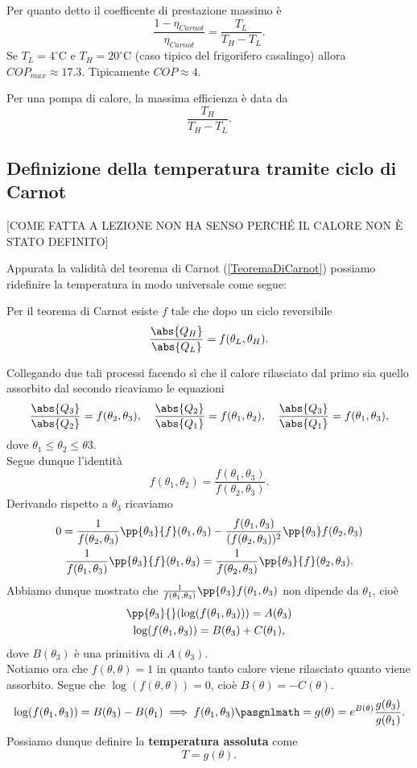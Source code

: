 \begin{remark}
Per quanto detto il coefficente di prestazione massimo \`e
\[\frac{1-\eta_{Carnot}}{\eta_{Carnot}}= \frac{T_L}{T_H-T_L}.\]
Se $T_L=4^\circ\mathrm{C}$ e $T_H=20^\circ\mathrm{C}$ (caso tipico del frigorifero casalingo) allora $COP_{max}\approx 17.3$. Tipicamente $COP\approx 4$.
\end{remark}
\begin{remark}
Per una pompa di calore, la massima efficienza \`e data da
\[\frac{T_H}{T_H-T_L}.\]
\end{remark}

\subsection{Definizione della temperatura tramite ciclo di Carnot}

[COME FATTA A LEZIONE NON HA SENSO PERCH\'E IL CALORE NON \`E STATO DEFINITO]

Appurata la validit\`a del teorema di Carnot (\ref{TeoremaDiCarnot}) possiamo ridefinire la temperatura in modo universale come segue:

Per il teorema di Carnot esiste $f$ tale che dopo un ciclo reversibile
\[\frac{\abs{Q_H}}{\abs{Q_L}}=f(\theta_L,\theta_H).\]

Collegando due tali processi facendo s\`i che il calore rilasciato dal primo sia quello assorbito dal secondo ricaviamo le equazioni
\[\frac{\abs{Q_3}}{\abs{Q_2}}=f(\theta_2,\theta_3),\quad\frac{\abs{Q_2}}{\abs{Q_1}}=f(\theta_1,\theta_2),\quad \frac{\abs{Q_3}}{\abs{Q_1}}=f(\theta_1,\theta_3),\]
dove $\theta_1\leq \theta_2\leq \theta3$.\\
Segue dunque l'identit\`a
\[f(\theta_1,\theta_2)=\frac{f(\theta_1,\theta_3)}{f(\theta_2,\theta_3)}.\]
Derivando rispetto a $\theta_3$ ricaviamo
\begin{gather*}
0=\frac1{f(\theta_2,\theta_3)}\pp{\theta_3}{f}(\theta_1,\theta_3)-\frac{f(\theta_1,\theta_3)}{(f(\theta_2,\theta_3))^2}\pp{\theta_3}f(\theta_2,\theta_3)\\
\frac1{f(\theta_1,\theta_3)}\pp{\theta_3}{f}(\theta_1,\theta_3)=\frac1{f(\theta_2,\theta_3)}\pp{\theta_3}{f}(\theta_2,\theta_3).
\end{gather*}
Abbiamo dunque mostrato che $\frac1{f(\theta_1,\theta_3)}\pp{\theta_3}f(\theta_1,\theta_3)$ non dipende da $\theta_1$, cio\`e
\begin{gather*}
\pp{\theta_3}{}(\log(f(\theta_1,\theta_3)))=A(\theta_3)\\
\log(f(\theta_1,\theta_3))=B(\theta_3)+C(\theta_1),
\end{gather*}
dove $B(\theta_3)$ \`e una primitiva di $A(\theta_3)$.\\
Notiamo ora che $f(\theta,\theta)=1$ in quanto tanto calore viene rilasciato quanto viene assorbito. Segue che $\log(f(\theta,\theta))=0$, cio\`e $B(\theta)=-C(\theta)$.
\[\log(f(\theta_1,\theta_3))=B(\theta_3)-B(\theta_1)\implies f(\theta_1,\theta_3)\pasgnlmath={g(\theta)=e^{B(\theta)}}\frac{g(\theta_3)}{g(\theta_1)}.\]
Possiamo dunque definire la \textbf{temperatura assoluta} come
\[T=g(\theta).\]